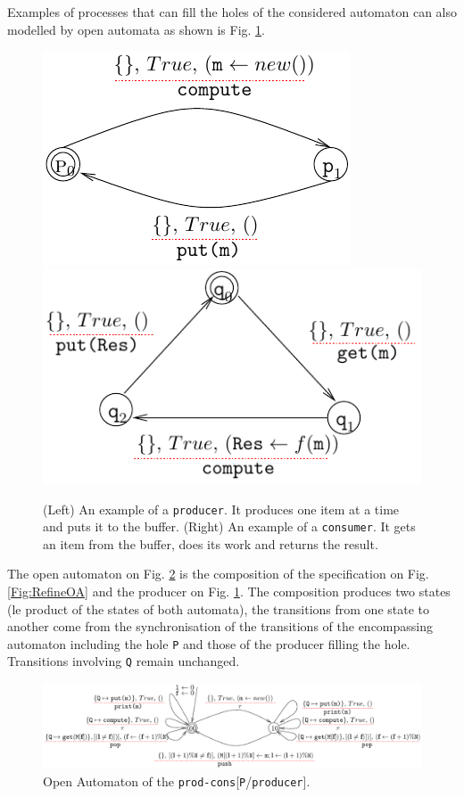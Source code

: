 \documentclass[runningheads]{llncs}
\begin{document}
\begin{example} Examples of processes that can fill the holes of the considered automaton can also modelled by open automata as shown is  Fig. \ref{Fig:procandcons}.
 \begin{figure}[h]
 \centering
   \includegraphics[width=.35\textwidth]{Figures/P-proc.pdf}\hfill 
   \includegraphics[width=.45\textwidth]{Figures/Q-proc.pdf}
   \caption{(Left) An example of a \texttt{producer}.  It produces one item at a time and puts it to the buffer.  (Right)  An example of a \texttt{consumer}. It gets an item from the buffer, does its work and returns the result. \label{Fig:procandcons}}
\end{figure}



The open automaton on Fig. \ref{Fig:ComposeOA} is the composition of the specification on Fig. \ref{Fig:RefineOA} and the producer on Fig. \ref{Fig:procandcons}. The composition produces two states (le product of the states of both automata), the transitions from one state to another come from  the synchronisation  of the transitions of the encompassing automaton including the hole \texttt{P} and those of the producer filling the hole. Transitions involving \texttt{Q} remain unchanged.


\begin{figure}[h]
 \centering
   \includegraphics[width=.99\textwidth]{Figures/compos-FIFO-Pro.pdf}
   \caption{Open Automaton of the \texttt{prod-cons}[\texttt{P}/\texttt{producer}]. 
   \label{Fig:ComposeOA}} 
\end{figure}
\end{example}
\end{document}

